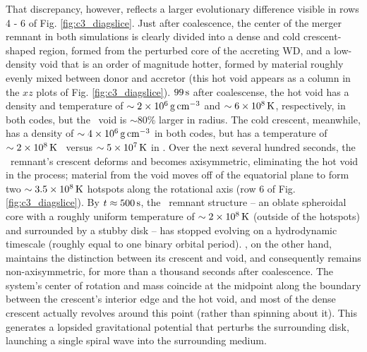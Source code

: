 
That discrepancy, however, reflects a larger evolutionary difference visible in rows 4 - 6 of Fig. \ref{fig:c3_diagslice}.  Just after coalescence, the center of the merger remnant in both simulations is clearly divided into a dense and cold crescent-shaped region, formed from the perturbed core of the accreting WD, and a low-density void that is an order of magnitude hotter, formed by material roughly evenly mixed between donor and accretor (this hot void appears as a column in the $xz$ plots of Fig. \ref{fig:c3_diagslice}).  $99\,\mathrm{s}$ after coalescense, the hot void has a density and temperature of $\sim2\times10^6\,\gcc$ and $\sim6\times10^8\,\mathrm{K}$, respectively, in both codes, but the \arepo\ void is $\sim80$\% larger in radius.  The cold crescent, meanwhile, has a density of $\sim4\times10^6\,\gcc$ in both codes, but has a temperature of $\sim2\times10^8\,\mathrm{K}$ \gasoline\ versus $\sim5\times10^7\,\mathrm{K}$ in \arepo.  Over the next several hundred seconds, the \gasoline\ remnant's crescent deforms and becomes axisymmetric, eliminating the hot void in the process; material from the void moves off of the equatorial plane to form two $\sim3.5\times10^8\,\mathrm{K}$ hotspots along the rotational axis (row 6 of Fig. \ref{fig:c3_diagslice}).  By $t\approx500\,\mathrm{s}$, the \gasoline\ remnant structure -- an oblate spheroidal core with a roughly uniform temperature of $\sim 2 \times 10^8\,\mathrm{K}$ (outside of the hotspots) and surrounded by a stubby disk -- has stopped evolving on a hydrodynamic timescale (roughly equal to one binary orbital period).  \arepo, on the other hand, maintains the distinction between its crescent and void, and consequently remains non-axisymmetric, for more than a thousand seconds after coalescence.  The system's center of rotation and mass coincide at the midpoint along the boundary between the crescent's interior edge and the hot void, and most of the dense crescent actually revolves around this point (rather than spinning about it).  This generates a lopsided gravitational potential that perturbs the surrounding disk, launching a single spiral wave into the surrounding medium.


